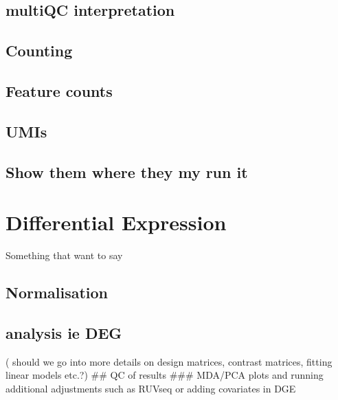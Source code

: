 \documentclass[
]{book}
\begin{document}
\hypertarget{multiqc-interpretation-1}{%
\section{multiQC interpretation}\label{multiqc-interpretation-1}}

\hypertarget{counting}{%
\section{Counting}\label{counting}}

\hypertarget{feature-counts}{%
\section{Feature counts}\label{feature-counts}}

\hypertarget{umis}{%
\section{UMIs}\label{umis}}

\hypertarget{show-them-where-they-my-run-it}{%
\section{Show them where they my run it}\label{show-them-where-they-my-run-it}}

\hypertarget{differential-expression}{%
\chapter{Differential Expression}\label{differential-expression}}

Something that want to say

\hypertarget{normalisation}{%
\section{Normalisation}\label{normalisation}}

\hypertarget{analysis-ie-deg}{%
\section{analysis ie DEG}\label{analysis-ie-deg}}

( should we go into more details on design matrices, contrast matrices, fitting linear models etc.?)
\#\# QC of results
\#\#\# MDA/PCA plots and running additional adjustments such as RUVseq or adding covariates in DGE
\end{document}

